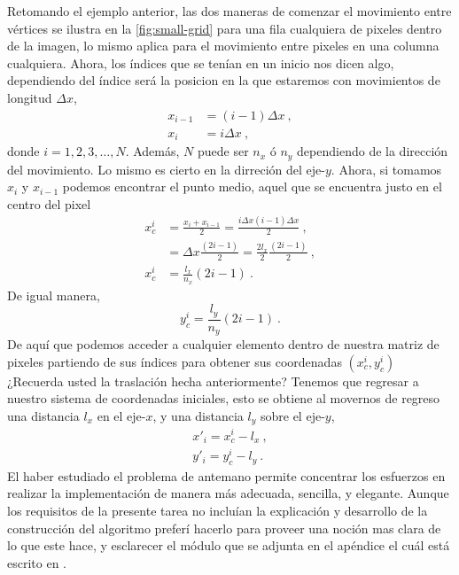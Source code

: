 Retomando el ejemplo anterior, las dos maneras de comenzar el movimiento entre vértices se ilustra en la \cref{fig:small-grid} para una fila cualquiera de pixeles dentro de la imagen, lo mismo aplica para el movimiento entre pixeles en una columna cualquiera. Ahora, los índices que se tenían en un inicio nos dicen algo, dependiendo del índice será la posicion en la que estaremos con movimientos de longitud $\Delta x$,
\begin{equation*}
    \begin{split}
        x_{i-1} & = (i - 1) \Delta x\ , \\
        x_{i} & = i \Delta x\ ,
    \end{split}
\end{equation*}
donde $i=1, 2, 3, \ldots, N$. Además, $N$ puede ser $n_x$ ó $n_y$ dependiendo de la dirección del movimiento. Lo mismo es cierto en la dirreción del eje-$y$. Ahora, si tomamos $x_i$ y $x_{i-1}$ podemos encontrar el punto medio, aquel que se encuentra justo en el centro del pixel
\begin{equation*}
    \begin{split}
        x_{c}^{i} & = \frac{x_i + x_{i-1}}{2} = \frac{i \Delta x (i-1) \Delta x}{2}\ , \\
        & = \Delta x \frac{(2i - 1)}{2} = \frac{2 l_x}{2} \frac{(2i - 1)}{2}\ ,\\
        x_{c}^{i} & = \frac{l_x}{n_x} (2i - 1)\ .
    \end{split}
\end{equation*}
De igual manera,
\begin{equation*}
    y_{c}^{i} = \frac{l_y}{n_y} (2i - 1)\ .
\end{equation*}
De aquí que podemos acceder a cualquier elemento dentro de nuestra matriz de pixeles partiendo de sus índices para obtener sus coordenadas $(x_{c}^{i}, y_{c}^{i})$ ¿Recuerda usted la traslación hecha anteriormente? Tenemos que regresar a nuestro sistema de coordenadas iniciales, esto se obtiene al movernos de regreso una distancia $l_x$ en el eje-$x$, y una distancia $l_y$ sobre el eje-$y$,
\begin{equation}
    \begin{split}
        x'_i = x_{c}^i - l_x\ , \\
        y'_i = y_{c}^i - l_y\ .
    \end{split}
\end{equation}
El haber estudiado el problema de antemano permite concentrar los esfuerzos en realizar la implementación de manera más adecuada, sencilla, y elegante. Aunque los requisitos de la presente tarea no incluían la explicación y desarrollo de la construcción del algoritmo preferí hacerlo para proveer una noción mas clara de lo que este hace, y esclarecer el módulo que se adjunta en el apéndice el cuál está escrito en .

